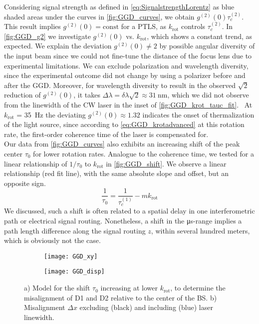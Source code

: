\noindent Considering signal strength as defined in \cref{eq:SignalstrengthLorentz} as blue shaded areas under the curves in \cref{fig:GGD_curves}, we obtain $g^{(2)}(0)\tau_c^{(2)}$. This result implies $g^{(2)}(0)=\mathrm{const}$ for a \ac{PTLS}, as $k_\mathrm{rot}$ controls $\tau_c^{(2)}$. In \cref{fig:GGD_g2} we investigate $g^{(2)}(0)$ vs. $k_\mathrm{rot}$, which shows a constant trend, as expected. We explain the deviation $g^{(2)}(0)\neq2$ by possible angular diversity of the input beam since we could not fine-tune the distance of the focus lens due to experimental limitations. We can exclude polarization and wavelength diversity, since the experimental outcome did not change by using a polarizer before and after the \ac{GGD}. Moreover, for wavelength diversity to result in the observed $\sqrt{2}$ reduction of $g^{(2)}(0)$, it takes $\Delta\lambda=\delta\lambda\sqrt{2}\approx \SI{31}{\nm}$, which we did not observe from the linewidth of the \ac{CW} laser in the inset of \cref{fig:GGD_krot_tauc_fit}.~ At $k_\mathrm{rot}$ = \SI{35}{\Hz} the deviating $g^{(2)}(0)\approx 1.32$ indicates the onset of thermalization of the light source, since according to \cref{eq:GGD_krotadvanced} at this rotation rate, the first-order coherence time of the laser is compensated for.\\
Our data from \cref{fig:GGD_curves} also exhibits an increasing shift of the peak center $\tau_0$ for lower rotation rates. Analogue to the coherence time, we tested for a linear relationship of $1/\tau_0$ to $k_\mathrm{rot}$ in \cref{fig:GGD_shift}. We observe a linear relationship (red fit line), with the same absolute slope and offset, but an opposite sign.
\begin{equation}\label{eq:GGD_shift}
	\dfrac{1}{\tau_0}=	\dfrac{1}{\tau_c^{(1)}}-m k_\mathrm{rot}
\end{equation}
We discussed, such a shift is often related to a spatial delay in one interferometric path or electrical signal routing. Nonetheless, a shift in the \si{\us}-range implies a path length difference along the signal routing $z$, within several hundred meters, which is obviously not the case.
\begin{figure}[htp]
	\centering
	\begin{subfigure}{0.48\textwidth}
		\centering
		\texttt{[image: GGD\_xy]}
		\caption{}
		\label{fig:GGD_xy}
	\end{subfigure}
	\hfill
	\begin{subfigure}{0.49\textwidth}
		\centering
		\texttt{[image: GGD\_disp]}
		\caption{}
		\label{fig:GGD_disp}
	\end{subfigure}
	\caption{a) Model for the shift $\tau_0$ increasing at lower $k_\mathrm{rot}$, to determine the misalignment of D1 and D2 relative to the center of the \ac{BS}. b) Misalignment $\Delta x$ excluding (black) and including (blue) laser linewidth.}
\end{figure}
